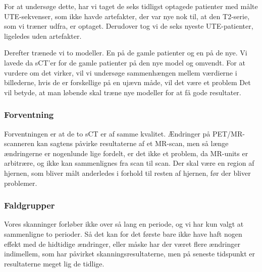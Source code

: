 For at undersøge dette, har vi taget de seks
tidligst optagede patienter med målte UTE-sekvenser, som ikke havde artefakter, der
var nye nok til, at den T2-serie, som vi træner udfra, er optaget.
Derudover tog vi de seks nyeste UTE-patienter, ligeledes uden artefakter.

Derefter trænede vi to modeller. En på de gamle patienter og en på de
nye. Vi lavede da sCT'er for de gamle patienter på den nye model og
omvendt. For at vurdere om det virker, vil vi undersøge sammenhængen mellem værdierne i billederne, hvis de er forskellige på en ujævn måde, vil det være et problem Det vil betyde, at man løbende skal træne nye modeller for at få gode resultater.

\subsubsection{Forventning}

Forventningen er at de to sCT er af samme kvalitet.
Ændringer på PET/MR-scanneren kan sagtens påvirke resultaterne af et MR-scan, men så længe ændringerne er nogenlunde lige fordelt, er det ikke
et problem, da MR-units er arbitrære, og ikke kan sammenlignes fra scan til
scan. Der skal være en region af hjernen, som bliver målt anderledes i
forhold til resten af hjernen, før der bliver problemer.

\subsubsection{Faldgrupper}

Vores skanninger forløber ikke over så lang en periode, og vi har
kun valgt at sammenligne to perioder. Så det kan for det første
bare ikke have haft nogen effekt med de hidtidige ændringer, eller
måske har der været flere ændringer indimellem, som har påvirket
skanningsresultaterne, men på seneste tidspunkt er resultaterne meget
lig de tidlige.

